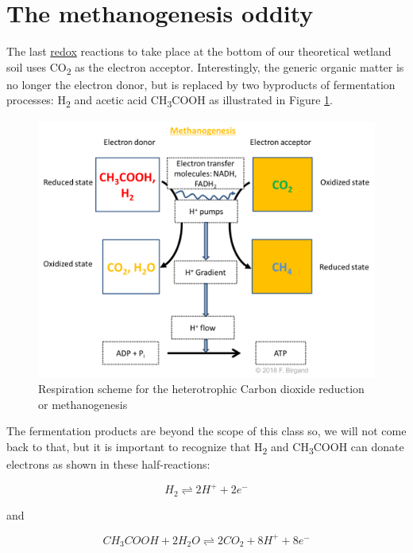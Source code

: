 \documentclass[]{book}
\theoremstyle{definition}
\theoremstyle{definition}
\theoremstyle{definition}
\theoremstyle{remark}
\begin{document}
\section{The methanogenesis oddity}\label{the-methanogenesis-oddity}

The last \protect\hyperlink{redox}{redox} reactions to take place at the
bottom of our theoretical wetland soil uses CO\textsubscript{2} as the
electron acceptor. Interestingly, the generic organic matter is no
longer the electron donor, but is replaced by two byproducts of
fermentation processes: H\textsubscript{2} and acetic acid
CH\textsubscript{3}COOH as illustrated in Figure \ref{fig:CO2-resp}.

\begin{figure}

{\centering \includegraphics[width=0.75\linewidth]{pictures/respiration-OM-CO2} 

}

\caption{Respiration scheme for the heterotrophic Carbon dioxide reduction or methanogenesis}\label{fig:CO2-resp}
\end{figure}

The fermentation products are beyond the scope of this class so, we will
not come back to that, but it is important to recognize that
H\textsubscript{2} and CH\textsubscript{3}COOH can donate electrons as
shown in these half-reactions:

\begin{equation}
H_2 \rightleftharpoons 2H^+ + 2 e^- 
\label{eq:H2-half-reaction}
\end{equation}

and

\begin{equation}
CH_3COOH + 2 H_2O \rightleftharpoons 2 CO_2 + 8 H^+ + 8 e^- 
\label{eq:acetic-acid-half-reaction}
\end{equation}
\end{document}
